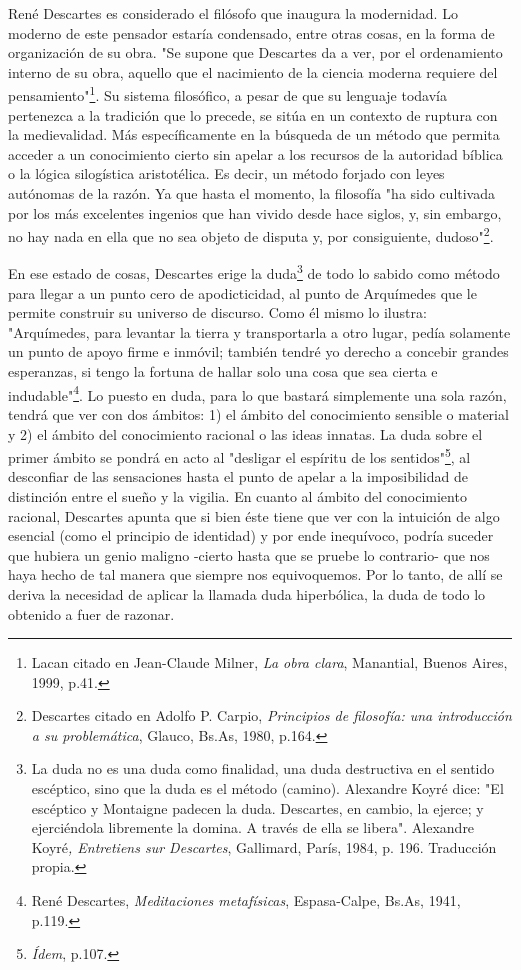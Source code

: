René Descartes es considerado el filósofo que inaugura la modernidad. Lo
moderno de este pensador estaría condensado, entre otras cosas, en la
forma de organización de su obra. "Se supone que Descartes da a ver, por
el ordenamiento interno de su obra, aquello que el nacimiento de la
ciencia moderna requiere del pensamiento"\footnote{Lacan citado en
  Jean-Claude Milner, \emph{La obra clara}, Manantial, Buenos Aires,
  1999, p.41.}. Su sistema filosófico, a pesar de que su lenguaje
todavía pertenezca a la tradición que lo precede, se sitúa en un
contexto de ruptura con la medievalidad. Más específicamente en la
búsqueda de un método que permita acceder a un conocimiento cierto sin
apelar a los recursos de la autoridad bíblica o la lógica silogística
aristotélica. Es decir, un método forjado con leyes autónomas de la
razón. Ya que hasta el momento, la filosofía "ha sido cultivada por los
más excelentes ingenios que han vivido desde hace siglos, y, sin
embargo, no hay nada en ella que no sea objeto de disputa y, por
consiguiente, dudoso"\footnote{Descartes citado en Adolfo P. Carpio,
  \emph{Principios de filosofía: una introducción a su problemática},
  Glauco, Bs.As, 1980, p.164.}.

En ese estado de cosas, Descartes erige la duda\footnote{La duda no es
  una duda como finalidad, una duda destructiva en el sentido escéptico,
  sino que la duda es el método (camino). Alexandre Koyré dice: "El
  escéptico y Montaigne padecen la duda. Descartes, en cambio, la
  ejerce; y ejerciéndola libremente la domina. A través de ella se
  libera". Alexandre Koyré\emph{, Entretiens sur Descartes}, Gallimard,
  París, 1984, p. 196. Traducción propia.} de todo lo sabido como método
para llegar a un punto cero de apodicticidad, al punto de Arquímedes que
le permite construir su universo de discurso. Como él mismo lo ilustra:
"Arquímedes, para levantar la tierra y transportarla a otro lugar, pedía
solamente un punto de apoyo firme e inmóvil; también tendré yo derecho a
concebir grandes esperanzas, si tengo la fortuna de hallar solo una cosa
que sea cierta e indudable"\footnote{René Descartes, \emph{Meditaciones
  metafísicas}, Espasa-Calpe, Bs.As, 1941, p.119.}. Lo puesto en duda,
para lo que bastará simplemente una sola razón, tendrá que ver con dos
ámbitos: 1) el ámbito del conocimiento sensible o material y 2) el
ámbito del conocimiento racional o las ideas innatas. La duda sobre el
primer ámbito se pondrá en acto al "desligar el espíritu de los
sentidos"\footnote{\emph{Ídem}, p.107.}, al desconfiar de las
sensaciones hasta el punto de apelar a la imposibilidad de distinción
entre el sueño y la vigilia. En cuanto al ámbito del conocimiento
racional, Descartes apunta que si bien éste tiene que ver con la
intuición de algo esencial (como el principio de identidad) y por ende
inequívoco, podría suceder que hubiera un genio maligno -cierto hasta
que se pruebe lo contrario- que nos haya hecho de tal manera que siempre
nos equivoquemos. Por lo tanto, de allí se deriva la necesidad de
aplicar la llamada duda hiperbólica, la duda de todo lo obtenido a fuer
de razonar.

